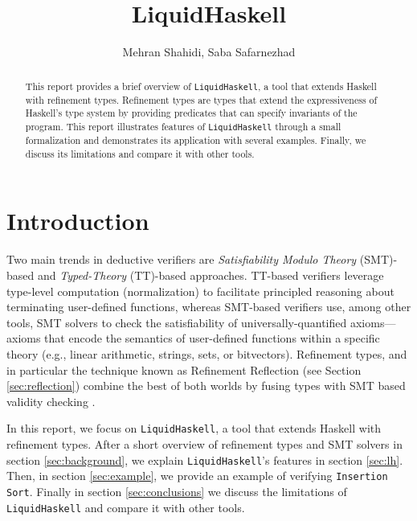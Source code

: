 \documentclass[]{rptuseminar}
\title{\textbf{Liquid}{H}\textbf{askell}}
\author{Mehran Shahidi, Saba Safarnezhad
  \institute{Rheinland-Pfälzische Technische Universität Kaiserslautern-Landau, Department of Computer Science}}
\begin{document}

\maketitle


\begin{abstract}
  This report provides a brief overview of \texttt{LiquidHaskell}, a tool that extends Haskell with refinement types. 
  Refinement types are types that extend the expressiveness of Haskell's type system by providing predicates that can specify invariants of the program. 
  This report illustrates features of \texttt{LiquidHaskell} through a small formalization and demonstrates its application with several examples. 
  Finally, we discuss its limitations and compare it with other tools.
\end{abstract}


\section{Introduction}
\label{sec:introduction}
Two main trends in deductive verifiers are \textit{Satisfiability Modulo Theory} (SMT)-based and \textit{Typed-Theory} (TT)-based approaches. 
TT-based verifiers leverage type-level computation (normalization) to facilitate principled reasoning about terminating user-defined functions,
whereas SMT-based verifiers use, among other tools, SMT solvers to check the satisfiability of universally-quantified axioms—axioms 
that encode the semantics of user-defined functions within a specific theory (e.g., linear arithmetic, strings, sets, or bitvectors).
Refinement types, and in particular the technique known as Refinement Reflection (see Section \ref {sec:reflection}) combine the best of both worlds by fusing types with SMT based validity checking \cite{vazou_refinement_2018}.

In this report, we focus on \texttt{LiquidHaskell}, a tool that extends Haskell with refinement types.
After a short overview of refinement types and SMT solvers in section \ref{sec:background}, 
we explain \texttt{LiquidHaskell}'s features in section \ref{sec:lh}. Then, in section \ref{sec:example}, we provide an example of verifying \texttt{Insertion Sort}. 
Finally in section \ref{sec:conclusions} we 
discuss the limitations of \texttt{LiquidHaskell} and compare it with other tools.
\end{document}
